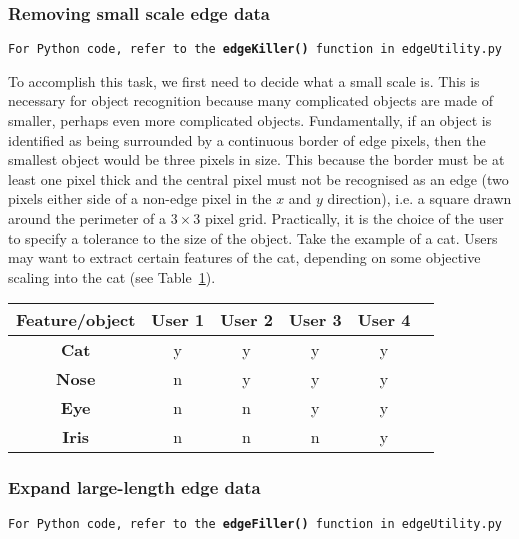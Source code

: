 \documentclass[11pt]{article}
\begin{document}
\subsubsection{Removing small scale edge data}
\begin{center}
\texttt{For Python code, refer to the {\bf edgeKiller()} function in edgeUtility.py}
\end{center}
To accomplish this task, we first need to decide what a small scale is. This is necessary for object recognition because many complicated objects are made of smaller, perhaps even more complicated objects. Fundamentally, if an object is identified as being surrounded by a continuous border of edge pixels, then the smallest object would be three pixels in size. This because the border must be at least one pixel thick and the central pixel must not be recognised as an edge (two pixels either side of a non-edge pixel in the $x$ and $y$ direction), i.e. a square drawn around the perimeter of a $3 \times 3$ pixel grid. Practically, it is the choice of the user to specify a tolerance to the size of the object. Take the example of a cat. Users may want to extract certain features of the cat, depending on some objective scaling into the cat (see Table~\ref{cat_table}).

\begin{table}[h]
\begin{center}
\begin{tabular}{|c|c|c|c|c|c|}
\hline
{\bf Feature/object} & {\bf User 1} & {\bf User 2} & {\bf User 3} & {\bf User 4}\\
\hline
{\bf Cat} & y & y & y & y\\
\hline
{\bf Nose} & n & y & y & y\\
\hline
{\bf Eye} & n & n & y & y\\
\hline
{\bf Iris} & n & n & n & y\\
\hline
\end{tabular}
\end{center}
\label{cat_table}
\end{table}




\subsubsection{Expand large-length edge data}
\begin{center}
\texttt{For Python code, refer to the {\bf edgeFiller()} function in edgeUtility.py}
\end{center}
\end{document}
